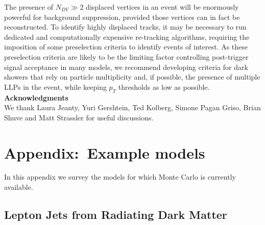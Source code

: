 The presence of $N_{DV}\gg 2$ displaced vertices in an event will be enormously powerful for background suppression, provided those vertices can in fact be reconstructed. To identify highly displaced tracks, it may be necessary to run dedicated and  computationally expensive re-tracking algorithms,  requiring the imposition of some preselection criteria to identify events of interest.   As these preselection criteria are likely to be the limiting factor controlling post-trigger signal acceptance in many models, we recommend developing criteria for dark showers that rely on particle multiplicity and, if possible,  the presence of multiple LLPs in the event, while keeping $p_T$ thresholds as low as possible.  \\

\vspace{1cm}
\textbf{Acknowledgments}\\
We thank Laura Jeanty, Yuri Gershtein, Ted Kolberg, Simone Pagan Griso, Brian Shuve and Matt Strassler for useful discussions.

\section{Appendix:~Example models}
\label{sec:darkshowermodels}
In this appendix we survey the models for which  Monte Carlo is currently available. 

\subsection{Lepton Jets from Radiating Dark Matter }



